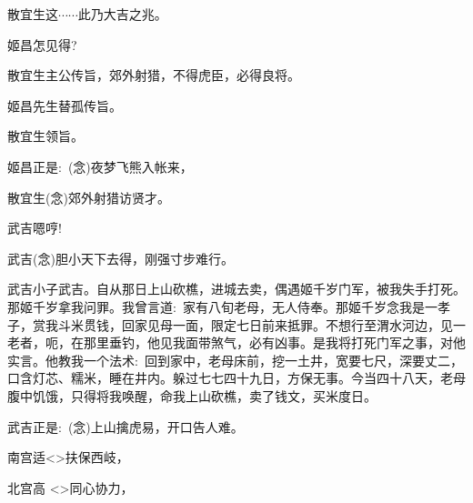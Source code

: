 {散宜生\hspace{20pt}这$\cdots{}\cdots{}$此乃大吉之兆。

姬昌\hspace{30pt}怎见得?

散宜生\hspace{20pt}主公传旨，郊外射猎，不得虎臣，必得良将。

姬昌\hspace{30pt}先生替孤传旨。

散宜生\hspace{20pt}领旨。

姬昌\hspace{30pt}正是:~({\akai 念})夜梦飞熊入帐来，

	散宜生\hspace{20pt}({\akai 念})郊外射猎访贤才。

\vspace{5pt}

武吉\hspace{30pt}嗯哼!

武吉\hspace{30pt}({\akai 念})胆小天下去得，刚强寸步难行。

\setlength{\hangindent}{52pt}   %
{武吉\hspace{30pt}小子武吉。自从那日上山砍樵，进城去卖，偶遇姬千岁门军，被我失手打死。那姬千岁拿我问罪。我曾言道:~家有八旬老母，无人侍奉。那姬千岁念我是一孝子，赏我斗米贯钱，回家见母一面，限定七日前来抵罪。不想行至渭水河边，见一老者，呃，在那里垂钓，他见我面带煞气，必有凶事。是我将打死门军之事，对他实言。他教我一个法术:~回到家中，老母床前，挖一土井，宽要七尺，深要丈二，口含灯芯、糯米，睡在井内。躲过七七四十九日，方保无事。今当四十八天，老母腹中饥饿，只得将我唤醒，命我上山砍樵，卖了钱文，买米度日。}

武吉\hspace{30pt}正是:~({\akai 念})上山擒虎易，开口告人难。

\vspace{5pt}

	南宫适\hspace{20pt}\textless{}\!\textgreater{}扶保西岐，

北宫高\hspace{20pt} \textless{}\!\textgreater{}同心协力，

}
